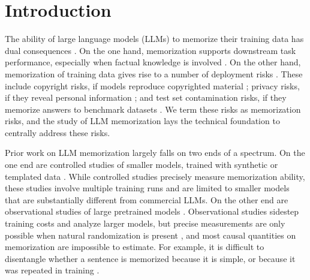 \section{Introduction}

The ability of large language models (LLMs) to memorize their training data has dual consequences \citep[][\textit{inter alia}]{carlini_extracting_2021}. On the one hand, memorization supports downstream task performance, especially when factual knowledge is involved \citep{petroni-etal-2019-language, feldman_what_2020}. On the other hand, memorization of training data gives rise to a number of deployment risks \citep{hartmann2023sokmemorizationgeneralpurposelarge}. These include copyright risks, if models reproduce copyrighted material \citep{foundation_henderson_2023}; privacy risks, if they reveal personal information \citep{DBLP:conf/fat/BrownLMST22}; and test set contamination risks, if they memorize answers to benchmark datasets \citep{magar-schwartz-2022-data}. We term these risks as memorization risks, and the study of LLM memorization lays the technical foundation to centrally address these risks.

Prior work on LLM memorization largely falls on two ends of a spectrum. On the one end are controlled studies of smaller models, trained with synthetic or templated data \citep{zhang_counterfactual_2023, allen-zhu_physics_2024, morris2025languagemodelsmemorize}. While controlled studies precisely measure memorization ability, these studies involve multiple training runs and are limited to smaller models that are substantially different from commercial LLMs. On the other end are observational studies of large pretrained models \citep[e.g.,][\textit{inter alia}]{prashanth2025recite}. Observational studies sidestep training costs and analyze larger models, but precise measurements are only possible when natural randomization is present \citep[as in][]{lesci-etal-2024-causal, wei-etal-2024-proving}, and most causal quantities on memorization are impossible to estimate. For example, it is difficult to disentangle whether a sentence is memorized because it is simple, or because it was repeated in training \citep{huang2024demystifyingverbatimmemorizationlarge}.

